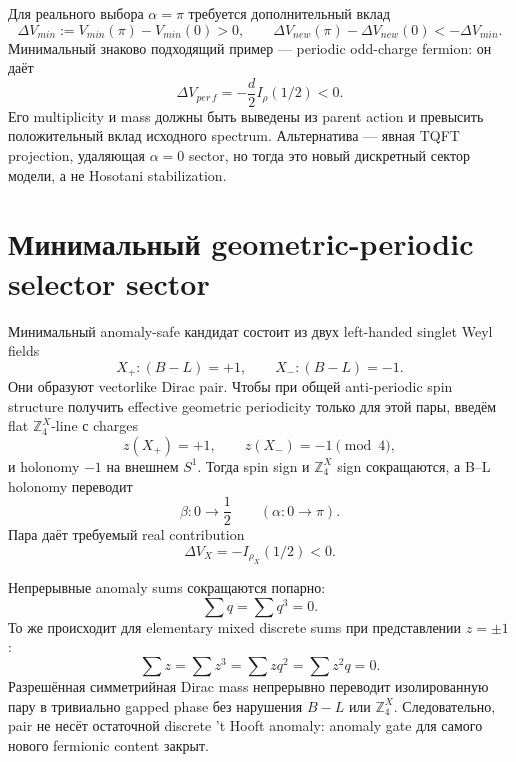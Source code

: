 Для реального выбора \(\alpha=\pi\) требуется дополнительный вклад
\begin{equation}
 \Delta V_{min}:=V_{min}(\pi)-V_{min}(0)>0,
 \qquad
 \Delta V_{new}(\pi)-\Delta V_{new}(0)<-\Delta V_{min}.
\end{equation}
Минимальный знаково подходящий пример --- periodic odd-charge fermion: он
даёт
\begin{equation}
 \Delta V_{per\,f}=-\frac d2I_\rho(1/2)<0.
\end{equation}
Его multiplicity и mass должны быть выведены из parent action и превысить
положительный вклад исходного spectrum. Альтернатива --- явная TQFT
projection, удаляющая \(\alpha=0\) sector, но тогда это новый дискретный
сектор модели, а не Hosotani stabilization.

\section{Минимальный geometric-periodic selector sector}

Минимальный anomaly-safe кандидат состоит из двух left-handed singlet Weyl
fields
\begin{equation}
 X_+:(B-L)=+1,
 \qquad
 X_-:(B-L)=-1.
\end{equation}
Они образуют vectorlike Dirac pair. Чтобы при общей anti-periodic spin
structure получить effective geometric periodicity только для этой пары,
введём flat \(\mathbb Z_4^X\)-line с charges
\begin{equation}
 z(X_+)=+1,
 \qquad
 z(X_-)=-1\pmod4,
\end{equation}
и holonomy \(-1\) на внешнем \(S^1\). Тогда spin sign и \(\mathbb Z_4^X\)
sign сокращаются, а B--L holonomy переводит
\begin{equation}
 \beta:0\longrightarrow\frac12
 \qquad (\alpha:0\longrightarrow\pi).
\end{equation}
Пара даёт требуемый real contribution
\begin{equation}
 \Delta V_X=-I_{\rho_X}(1/2)<0.
\end{equation}

Непрерывные anomaly sums сокращаются попарно:
\begin{equation}
 \sum q=\sum q^3=0.
\end{equation}
То же происходит для elementary mixed discrete sums при представлении
\(z=\pm1\):
\begin{equation}
 \sum z=\sum z^3=\sum zq^2=\sum z^2q=0.
\end{equation}
Разрешённая симметрийная Dirac mass непрерывно переводит изолированную пару
в тривиально gapped phase без нарушения \(B-L\) или \(\mathbb Z_4^X\).
Следовательно, pair не несёт остаточной discrete 't Hooft anomaly: anomaly
gate для самого нового fermionic content закрыт.


